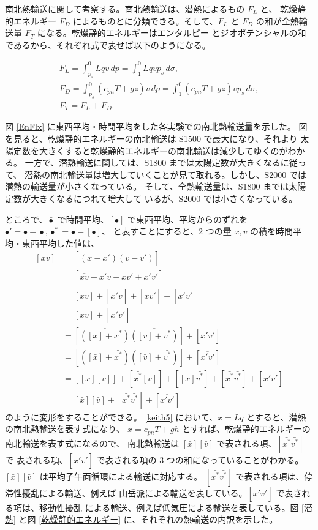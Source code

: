 \documentclass[body]{subfiles}
\begin{document}
南北熱輸送に関して考察する。南北熱輸送は、潜熱によるもの \(F_L\) と、
乾燥静的エネルギー \(F_D\) によるものとに分類できる。そして、\(F_L\) と
\(F_D\) の和が全熱輸送量 \(F_T\) になる。乾燥静的エネルギーはエンタルピー
とジオポテンシャルの和であるから、それぞれ式で表せば以下のようになる。

\begin{gather}
	F_L=\int_{p_s}^0 Lqv\,dp=\int_1^0 Lqvp_s\,d\sigma,\\
	F_D=\int_{p_s}^0 (c_{pn}T+gz)v\,dp=\int_1^0 (c_{pn}T+gz)vp_s\,d\sigma,\\
	F_T=F_L+F_D.
\end{gather}

図 \ref{EnFlx} に東西平均・時間平均をした各実験での南北熱輸送量を示した。
図を見ると、乾燥静的エネルギーの南北輸送は S1500 で最大になり、それより
太陽定数を大きくすると乾燥静的エネルギーの南北輸送は減少してゆくのがわかる。
一方で、潜熱輸送に関しては、S1800 までは太陽定数が大きくなるに従って、
潜熱の南北輸送量は増大していくことが見て取れる。しかし、S2000 では
潜熱の輸送量が小さくなっている。
そして、全熱輸送量は、S1800 までは太陽定数が大きくなるにつれて増大して
いるが、S2000 では小さくなっている。

ところで、\(\bar\bullet\) で時間平均、\([\bullet]\) で東西平均、平均からのずれを
\(\bullet'=\bullet-\bar\bullet, \bullet^*=\bullet-[\bullet]\)、
と表すことにすると、2 つの量 \(x,v\) の積を時間平均・東西平均した値は、
\begin{equation}
	\begin{split}
		[\overline{xv}]&=[\overline{(\bar x-x')(\bar v-v')}]\\
		&=[\overline{\bar x\bar v}+\overline{x'\bar v}+\overline{\bar xv'}+\overline{x'v'}]\\
		&=[\bar x\bar v]+[\bar{x'}\bar v]+[\bar x\bar{v'}]+[\overline{x'v'}]\\
		&=[\bar x\bar v]+[\overline{x'v'}]\\
		&=[\overline{([x]+x^*)}\overline{([v]+v^*)}]+[\overline{x'v'}]\\
		&=[([\bar x]+\bar{x^*})([\bar v]+\bar{v^*})]+[\overline{x'v'}]\\
		&=[[\bar x][\bar v]]+[\bar{x^*}[\bar v]]+[[\bar x]\bar{v^*}]+[\bar{x^*}\bar{v^*}]+[\overline{x'v'}]\\
		&=[\bar x][\bar v]+[\bar{x^*}\bar{v^*}]+[\overline{x'v'}]
	\end{split}\label{keith5}
\end{equation}
のように変形をすることができる。
\eqref{keith5} において、\(x=Lq\) とすると、潜熱の南北熱輸送を表す式になり、
\(x=c_{pn}T+gh\) とすれば、乾燥静的エネルギーの南北輸送を表す式になるので、
南北熱輸送は \([\bar x][\bar v]\) で表される項、\([\bar{x^*}\bar{v^*}]\) で
表される項、\([\overline{x'v'}]\) で表される項の 3 つの和になっていることがわかる。
\([\bar x][\bar v]\) は平均子午面循環による輸送に対応する。
\([\bar{x^*}\bar{v^*}]\) で表される項は、停滞性擾乱による輸送、例えば
山岳派による輸送を表している。\([\overline{x'v'}]\) で表される項は、移動性擾乱
による輸送、例えば低気圧による輸送を表している。図 \ref{潜熱} と図
\ref{乾燥静的エネルギー} に、それぞれの熱輸送の内訳を示した。
\end{document}
